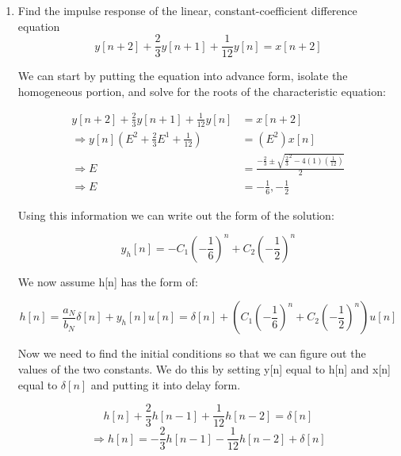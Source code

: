 \documentclass{article}
\begin{document}
\begin{enumerate}
    \item Find the impulse response of the linear, constant-coefficient difference equation
    \begin{equation}
        y[n+2] + \frac{2}{3}y[n+1] + \frac{1}{12}y[n] = x[n+2]
    \end{equation}
    \begin{center}
        We can start by putting the equation into advance form, isolate the homogeneous portion, and solve for the roots of the characteristic equation:
    \end{center}
    \begin{align}
        y[n+2] + \frac{2}{3}y[n+1] + \frac{1}{12}y[n] &= x[n+2]\\
        \Rightarrow y[n](E^2 + \frac{2}{3}E^1 + \frac{1}{12}) &= (E^2)x[n]\\
        \Rightarrow E &= \frac{-\frac{2}{3} \pm \sqrt{\frac{2}{3}^2-4(1)(\frac{1}{12})}}{2} \\
        \Rightarrow E &= -\frac{1}{6}, -\frac{1}{2}
    \end{align}
    \begin{center}
        Using this information we can write out the form of the solution:
    \end{center}
    \begin{equation}
        y_h[n] = - C_1\left(-\frac{1}{6}\right)^n+ C_2\left(-\frac{1}{2}\right)^n
    \end{equation}
    \begin{center}
        We now assume h[n] has the form of:
    \end{center}
    \begin{equation}
        h[n] = \frac{a_N}{b_N}\delta[n] + y_h[n]u[n] = \delta[n] + \left(C_1\left(-\frac{1}{6}\right)^n +  C_2\left(-\frac{1}{2}\right)^n \right)u[n]
    \end{equation}
    \begin{center}
        Now we need to find the initial conditions so that we can figure out the values of the two constants. We do this by setting y[n] equal to h[n] and x[n] equal to $\delta[n] $ and putting it into delay form.
    \end{center}
    \begin{equation}
        h[n] + \frac{2}{3}h[n-1] + \frac{1}{12}h[n-2] = \delta[n]
    \end{equation}
    \begin{equation}
        \Rightarrow h[n] = -\frac{2}{3}h[n-1] - \frac{1}{12}h[n-2] + \delta[n]

\end{equation}
\end{enumerate}
\end{document}
